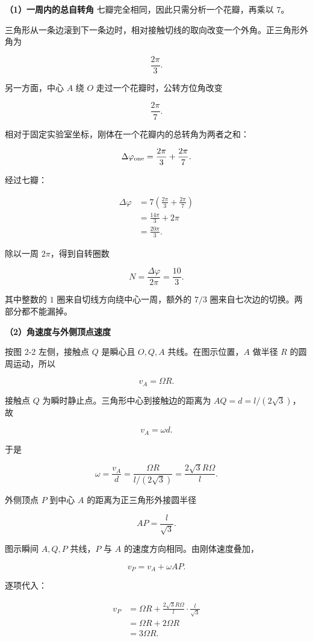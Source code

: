 \documentclass[12pt,a4paper,UTF8]{ctexart}
\begin{document}
\textbf{（1）一周内的总自转角}
七瓣完全相同，因此只需分析一个花瓣，再乘以 \(7\)。

三角形从一条边滚到下一条边时，相对接触切线的取向改变一个外角。正三角形外角为

\[\frac{2\pi}{3}.\]

另一方面，中心 \(A\) 绕 \(O\) 走过一个花瓣时，公转方位角改变

\[\frac{2\pi}{7}.\]

相对于固定实验室坐标，刚体在一个花瓣内的总转角为两者之和：

\[\Delta\varphi_{\rm one}=\frac{2\pi}{3}+\frac{2\pi}{7}.\]

经过七瓣：

\[\begin{aligned}
\Delta\varphi
&=7\left(\frac{2\pi}{3}+\frac{2\pi}{7}\right)\\
&=\frac{14\pi}{3}+2\pi\\
&=\frac{20\pi}{3}.
\end{aligned}\]

除以一周 \(2\pi\)，得到自转圈数

\[\boxed{N=\frac{\Delta\varphi}{2\pi}=\frac{10}{3}}.\]

其中整数的 \(1\) 圈来自切线方向绕中心一周，额外的 \(7/3\)
圈来自七次边的切换。两部分都不能漏掉。

\textbf{（2）角速度与外侧顶点速度}

按图 2-2 左侧，接触点 \(Q\) 是瞬心且 \(O,Q,A\) 共线。在图示位置，\(A\)
做半径 \(R\) 的圆周运动，所以

\[v_A=\Omega R.\]

接触点 \(Q\) 为瞬时静止点。三角形中心到接触边的距离为
\(AQ=d=l/(2\sqrt3)\)，故

\[v_A=\omega d.\]

于是

\[\omega=\frac{v_A}{d}
=\frac{\Omega R}{l/(2\sqrt3)}
=\boxed{\frac{2\sqrt3R\Omega}{l}}.\]

外侧顶点 \(P\) 到中心 \(A\) 的距离为正三角形外接圆半径

\[AP=\frac{l}{\sqrt3}.\]

图示瞬间 \(A,Q,P\) 共线，\(P\) 与 \(A\) 的速度方向相同。由刚体速度叠加，

\[v_P=v_A+\omega AP.\]

逐项代入：

\[\begin{aligned}
v_P
&=\Omega R+\frac{2\sqrt3R\Omega}{l}\cdot\frac{l}{\sqrt3}\\
&=\Omega R+2\Omega R\\
&=\boxed{3\Omega R}.
\end{aligned}\]
\end{document}
